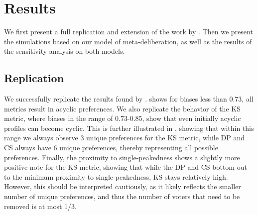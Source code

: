 \newpage
\chapter{Results}
\label{experiment_results}
We first present a full replication and extension of the work by
\citet{radDeliberationSinglePeakednessCoherent2021}. Then we present the simulations based on our model of
meta-deliberation, as well as the results of the sensitivity analysis on both
models.


\section{Replication}\label{sec: replication}

We successfully replicate the results found by
\citet{radDeliberationSinglePeakednessCoherent2021}.  
shows for biases less than 0.73, all metrics result in acyclic preferences. We also
replicate the behavior of the KS metric, where biases in the range of
0.73-0.85, show that even initially acyclic profiles can become cyclic. This is
further illustrated in , showing that within this range we
always observe 3 unique preferences for the KS metric, while DP and CS always
have 6 unique preferences, thereby representing all possible preferences.
Finally, the proximity to single-peakedness shows a slightly more positive note
for the KS metric, showing that while the DP and CS bottom out to the minimum
proximity to single-peakedness, KS stays relatively high. However, this should
be interpreted cautiously, as it likely reflects the smaller number of unique
preferences, and thus the number of voters that need to be removed is at most
1/3.

